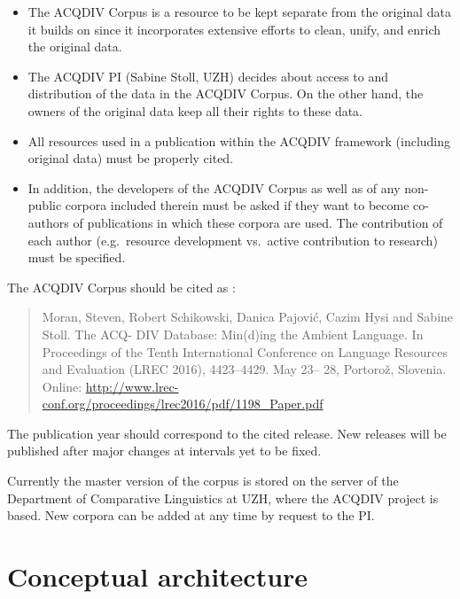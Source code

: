 \documentclass[a4paper, 11pt]{book}
\begin{document}
\begin{itemize}
	\item The ACQDIV Corpus is a resource to be kept separate from the original data it builds on since it incorporates extensive efforts to clean, unify, and enrich the original data.
	\item The ACQDIV PI (Sabine Stoll, UZH) decides about access to and distribution of the data in the ACQDIV Corpus. On the other hand, the owners of the original data keep all their rights to these data. 
	\item All resources used in a publication within the ACQDIV framework (including original data) must be properly cited.
	\item In addition, the developers of the ACQDIV Corpus as well as of any non-public corpora included therein must be asked if they want to become co-authors of publications in which these corpora are used. The contribution of each author (e.g.\ resource development vs.\ active contribution to research) must be specified. 
\end{itemize}

\noindent The ACQDIV Corpus should be cited as \cite{Moran_etal2016a}: 

\begin{quote}
Moran, Steven, Robert Schikowski, Danica Pajović, Cazim Hysi and Sabine Stoll. The ACQ- DIV Database: Min(d)ing the Ambient Language. In Proceedings of the Tenth International Conference on Language Resources and Evaluation (LREC 2016), 4423–4429. May 23– 28, Portorož, Slovenia. Online: \url{http://www.lrec-conf.org/proceedings/lrec2016/pdf/1198_Paper.pdf}
\end{quote}

The publication year should correspond to the cited release. New releases will be published after major changes at intervals yet to be fixed. 

Currently the master version of the corpus is stored on the server of the Department of Comparative Linguistics at UZH, where the ACQDIV project is based. New corpora can be added at any time by request to the PI. 



\section{Conceptual architecture}
\label{sec:Architecture}
\end{document}
